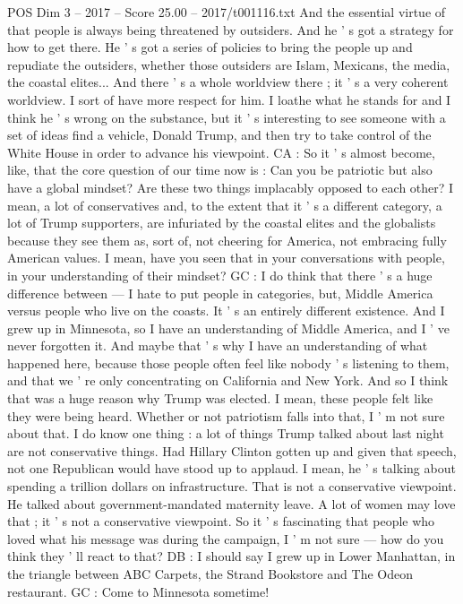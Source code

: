 \begin{textsample}{POS Dim 3 – 2017 – Score 25.00 – 2017/t001116.txt}
And the essential virtue of that people is always being threatened by outsiders.
And he ' s got a strategy for how to get there.
He ' s got a series of policies to bring the people up and repudiate the outsiders, whether those outsiders are Islam, Mexicans, the media, the coastal elites...
And there ' s a whole worldview there ; it ' s a very coherent worldview.
I sort of have more respect for him.
I loathe what he stands for and I think he ' s wrong on the substance, but it ' s interesting to see someone with a set of ideas find a vehicle, Donald Trump, and then try to take control of the White House in order to advance his viewpoint.
CA : So it ' s almost become, like, that the core question of our time now is : Can you be patriotic but also have a global mindset?
Are these two things implacably opposed to each other?
I mean, a lot of conservatives and, to the extent that it ' s a different category, a lot of Trump supporters, are infuriated by the coastal elites and the globalists because they see them as, sort of, not cheering for America, not embracing fully American values.
I mean, have you seen that in your conversations with people, in your understanding of their mindset?
GC : I do think that there ' s a huge difference between — I hate to put people in categories, but, Middle America versus people who live on the coasts.
It ' s an entirely different existence.
And I grew up in Minnesota, so I have an understanding of Middle America, and I ' ve never forgotten it.
And maybe that ' s why I have an understanding of what happened here, because those people often feel like nobody ' s listening to them, and that we ' re only concentrating on California and New York.
And so I think that was a huge reason why Trump was elected.
I mean, these people felt like they were being heard.
Whether or not patriotism falls into that, I ' m not sure about that.
I do know one thing : a lot of things Trump talked about last night are not conservative things.
Had Hillary Clinton gotten up and given that speech, not one Republican would have stood up to applaud.
I mean, he ' s talking about spending a trillion dollars on infrastructure.
That is not a conservative viewpoint.
He talked about government-mandated maternity leave.
A lot of women may love that ; it ' s not a conservative viewpoint.
So it ' s fascinating that people who loved what his message was during the campaign, I ' m not sure — how do you think they ' ll react to that?
DB : I should say I grew up in Lower Manhattan, in the triangle between ABC Carpets, the Strand Bookstore and The Odeon restaurant.
GC : Come to Minnesota sometime!

\end{textsample}
